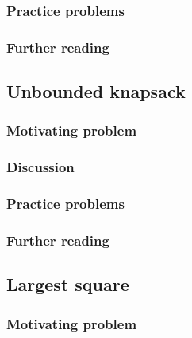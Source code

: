 \subsubsection*{Practice problems}

\subsubsection*{Further reading}

\subsection{Unbounded knapsack}

\subsubsection*{Motivating problem}







\subsubsection*{Discussion}

\subsubsection*{Practice problems}

\subsubsection*{Further reading}

\subsection{Largest square}

\subsubsection*{Motivating problem}


